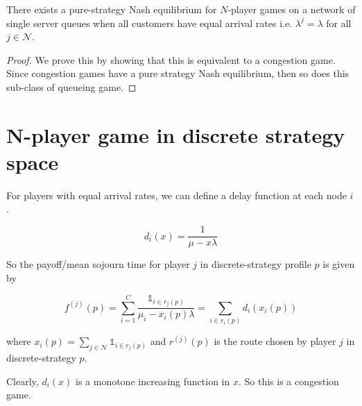 \begin{theorem}
There exists a pure-strategy Nash equilibrium for $N$-player games on a network of single server queues when all customers have equal arrival rates i.e. $\lambda^{j}=\lambda$ for all $j\in\mathcal{N}$.
\end{theorem}
\begin{proof}
We prove this by showing that this is equivalent to a congestion game.
Since congestion games have a pure strategy Nash equilibrium, then so does this sub-class of queueing game.
\end{proof}

\section{N-player game in discrete strategy space}

For players with equal arrival rates, we can define a delay function at each node $i$.

$$d_i(x) = \frac{1}{\mu - x\lambda}$$

So the payoff/mean sojourn time for player $j$ in discrete-strategy profile $p$ is given by 

$$f^{(j)}(p) = \sum_{i=1}^{C}\frac{\mathbb{1}_{i\in r_j(p)}}{\mu_i - x_i(p)\lambda}
 = \sum_{i\in r_i(p)} d_i(x_i(p))$$

 
where $x_i(p) = \sum_{j\in\mathcal{N}} \mathbb{1}_{i\in r_j(p)}$ and $r^{(j)}(p)$ is the route chosen by player $j$ in discrete-strategy $p$.

Clearly, $d_i(x)$ is a monotone increasing function in $x$. So this is a congestion game.











